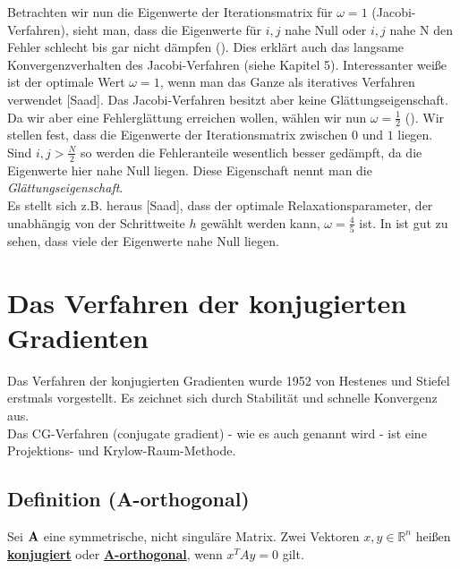 \label{img.Jacobi2}

Betrachten wir nun die Eigenwerte der Iterationsmatrix für $\omega = 1$ (Jacobi-Verfahren), sieht man, dass die Eigenwerte für $i,j$ nahe Null oder $i,j$ nahe N den Fehler schlecht bis gar nicht dämpfen (). Dies erklärt auch das langsame Konvergenzverhalten des Jacobi-Verfahren (siehe Kapitel 5). Interessanter weiße ist der optimale Wert $\omega = 1$, wenn man das Ganze als iteratives Verfahren verwendet [Saad]. Das Jacobi-Verfahren besitzt aber keine Glättungseigenschaft.\\
Da wir aber eine Fehlerglättung erreichen wollen, wählen wir nun $\omega = \frac {1} {2}$ (). Wir stellen fest, dass die Eigenwerte der Iterationsmatrix zwischen $0$ und $1$ liegen. Sind $i,j > \frac {N} {2}$ so werden die Fehleranteile wesentlich besser gedämpft, da die Eigenwerte hier nahe Null liegen. Diese Eigenschaft nennt man die \textit{Glättungseigenschaft}.\\
Es stellt sich z.B. heraus [Saad], dass der optimale Relaxationsparameter, der unabhängig von der Schrittweite $h$ gewählt werden kann, $\omega = \frac {4} {5}$ ist. In  ist gut zu sehen, dass viele der Eigenwerte nahe Null liegen.

\label{img.Jacobi3}

\section{Das Verfahren der konjugierten Gradienten}\label{s.Das Verfahren der konjugierten Gradienten}

Das Verfahren der konjugierten Gradienten wurde 1952 von Hestenes und Stiefel erstmals vorgestellt. Es zeichnet sich durch Stabilität und schnelle Konvergenz aus. \\
Das CG-Verfahren (conjugate gradient) - wie es auch genannt wird - ist eine Projektions- und Krylow-Raum-Methode.

\subsection{Definition (A-orthogonal)}\label{ss.A-orthogonal}
Sei ${\textbf{A}}$ eine symmetrische, nicht singuläre Matrix. Zwei Vektoren $x,y \in \mathbb{R}^{n}$ heißen \underline{\textbf{konjugiert}} oder \underline{\textbf{A-orthogonal}}, wenn $x^{T}Ay = 0$ gilt.

